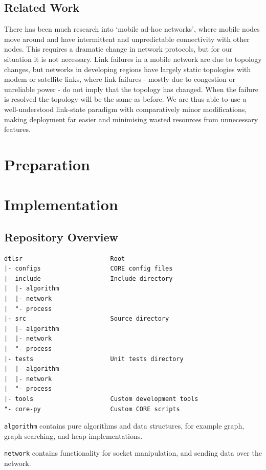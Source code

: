 \documentclass[10pt,twoside,a4paper]{article}
\begin{document}
\subsection{Related Work}

There has been much research into `mobile ad-hoc networks', where mobile nodes move around and have intermittent and unpredictable connectivity with other nodes. This requires a dramatic change in network protocols, but for our situation it is not necessary. Link failures in a mobile network are due to topology changes, but networks in developing regions have largely static topologies with modem or satellite links, where link failures - mostly due to congestion or unreliable power - do not imply that the topology has changed. When the failure is resolved the topology will be the same as before. We are thus able to use a well-understood link-state paradigm with comparatively minor modifications, making deployment far easier and minimising wasted resources from unnecessary features.



\section{Preparation}

\section{Implementation}

\subsection{Repository Overview}

\begin{verbatim}
dtlsr                        Root
|- configs                   CORE config files
|- include                   Include directory
|  |- algorithm
|  |- network
|  "- process
|- src                       Source directory
|  |- algorithm
|  |- network
|  "- process
|- tests                     Unit tests directory
|  |- algorithm
|  |- network
|  "- process
|- tools                     Custom development tools
"- core-py                   Custom CORE scripts
\end{verbatim}

\texttt{algorithm} contains pure algorithms and data structures, for example graph, graph searching, and heap implementations.

\texttt{network} contains functionality for socket manipulation, and sending data over the network.
\end{document}
